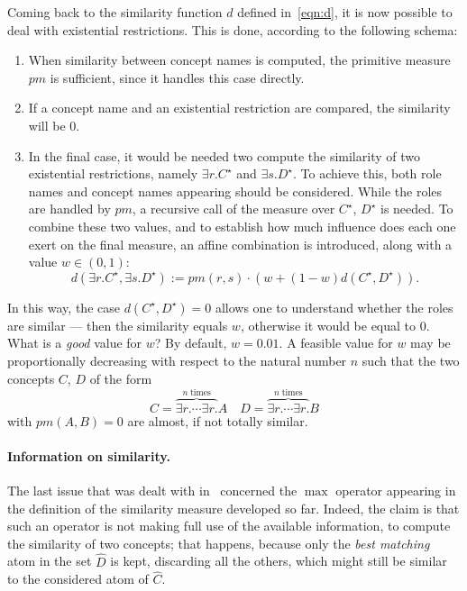 Coming back to the similarity function \(d\) defined in~\eqref{eqn:d}, it is now possible to deal with existential restrictions.
This is done, according to the following schema:

\begin{enumerate}
  \item When similarity between concept names is computed, the primitive measure \(pm\) is sufficient, since it handles this case directly.
  \item If a concept name and an existential restriction are compared, the similarity will be \(0\).
  \item In the final case, it would be needed two compute the similarity of two existential restrictions, namely \(\exists{}r.C^\star{}\) and \(\exists{}s.D^\star{}\).
  To achieve this, both role names and concept names appearing should be considered.
  While the roles are handled by \(pm\), a recursive call of the measure over \(C^\star\), \(D^\star\) is needed.
  To combine these two values, and to establish how much influence does each one exert on the final measure, an affine combination is introduced, along with a value \(w \in (0,1)\):
  \[
  d(\exists{}r.C^\star,\exists{}s.D^\star) :=
  pm(r,s) \cdot \left(w + (1-w)d(C^\star,D^\star)\right).
  \]
\end{enumerate}
  In this way, the case \(d(C^\star,D^\star) = 0\) allows one to understand whether the roles are similar --- then the similarity equals \(w\), otherwise it would be equal to \(0\).
  What is a \emph{good} value for \(w\)? By default, \(w = 0.01\).
  A feasible value for \(w\) may be proportionally decreasing with respect to the natural number \(n\) such that the two concepts \(C\), \(D\) of the form
  \[
  C = \overbrace{\exists{}r.\dotsb{}\exists{}r.}^{n\;\text{times}}A \quad
  D = \overbrace{\exists{}r.\dotsb{}\exists{}r.}^{n\;\text{times}}B
  \]
  with \(pm(A,B) = 0\) are almost, if not totally similar.

  \paragraph{Information on similarity.}
  The last issue that was dealt with in~\cite{LeTu12} concerned the \(\max{}\) operator appearing in the definition of the similarity measure developed so far.
  Indeed, the claim is that such an operator is not making full use of the available information, to compute the similarity of two concepts; that happens, because only the \emph{best matching} atom in the set \(\widehat{D}\) is kept, discarding all the others, which might still be similar to the considered atom of \(\widehat{C}\).

